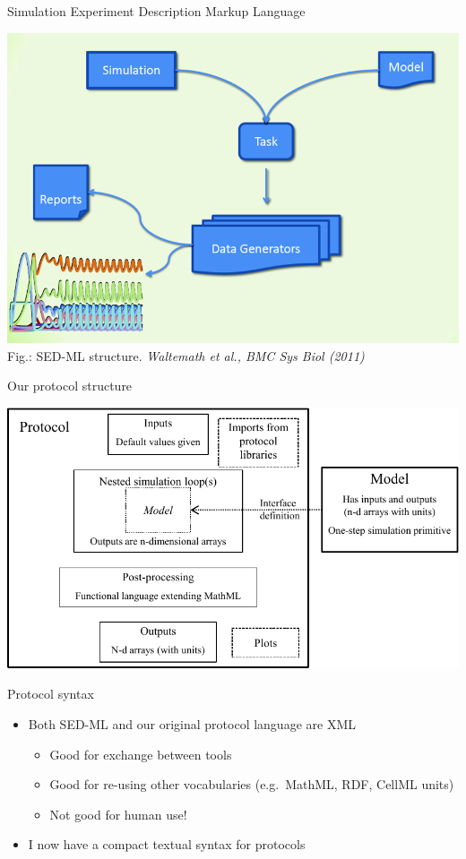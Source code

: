 \documentclass[t,xcolor={usenames,dvipsnames}]{beamer}
\begin{document}
\begin{frame}{Simulation Experiment Description Markup Language}
\begin{center}
\includegraphics[scale=.5]{SEDML_overview}\\
{\tiny Fig.: SED-ML structure. \textit{Waltemath et al., BMC Sys Biol (2011)}}
\end{center}
\end{frame}


\begin{frame}{Our protocol structure}
\begin{center}
\includegraphics[width=\textwidth]{protocol_language}
\end{center}
\end{frame}


\begin{frame}{Protocol syntax}
\begin{itemize}
\item Both SED-ML and our original protocol language are XML
  \begin{itemize}
  \item Good for exchange between tools
  \item Good for re-using other vocabularies (e.g.\ MathML, RDF, CellML units)
  \item Not good for human use!
  \end{itemize}
\item I now have a compact textual syntax for protocols
\end{itemize}
\end{frame}
\end{document}
